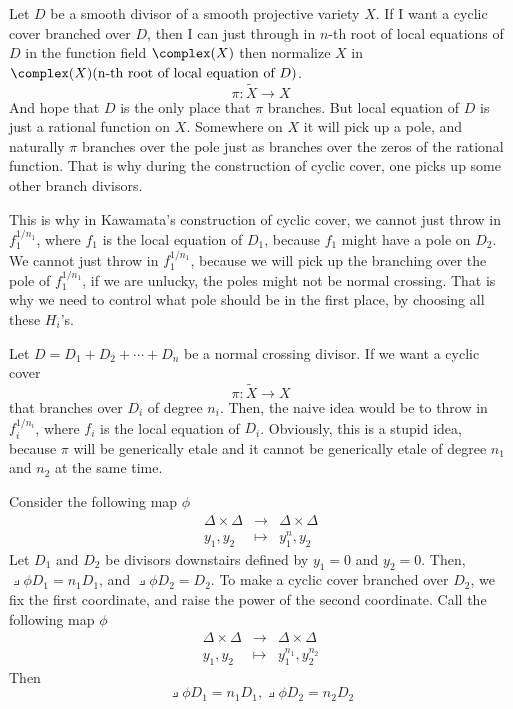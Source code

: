 \documentclass{article}
\begin{document}
Let $D$ be a smooth divisor of a smooth projective variety $X$. 
If I want a cyclic cover branched over $D$, then I can just through in
$n$-th root of local equations of $D$ in the function field $\complex(X)$ then
normalize $X$ in $\complex(X)(\text{n-th root of local equation of $D$})$.
\[
    \pi: \tilde{X} \rightarrow X
\]
And hope that $D$ is the only place that $\pi$ branches. But local equation
of $D$ is just a rational function on $X$. Somewhere on $X$ it will pick up
a pole, and naturally $\pi$ branches over the pole just as branches over the zeros
of the rational function. That is why during the construction of cyclic cover, one
picks up some other branch divisors.

This is why in Kawamata's construction of cyclic cover, we cannot just throw in
$f_1^{1/n_1}$, where $f_1$ is the local equation of $D_1$, because $f_1$ might 
have a pole on $D_2$. We cannot just throw in $f_1^{1/n_1}$, because we will 
pick up the branching over the pole of $f_1^{1/n_1}$, if we are unlucky, the 
poles might not be normal crossing. That is why we need to control what pole
should be in the first place, by choosing all these $H_i$'s.
 

Let $D = D_1 + D_2 +\cdots + D_n$ be a normal crossing divisor. If we want a 
cyclic cover 
\[
    \pi: \tilde{X} \rightarrow X
\]
that branches over $D_i$ of degree $n_i$. Then, the naive idea would be 
to throw in $f_i^{1/n_i}$, where $f_i$ is the local equation of $D_i$. 
Obviously, this is a stupid idea, because $\pi$ will be generically etale
and it cannot be generically etale of degree $n_1$ and $n_2$ at the same
time. 

Consider the following map $\phi$
\begin{align*}
    \Delta\times\Delta & \rightarrow & \Delta\times\Delta \\
      y_1, y_2         & \mapsto     & y_1^n, y_2
\end{align*}
Let $D_1$ and $D_2$ be divisors downstairs defined by $y_1=0$ and $y_2=0$.
Then, $\pullback{\phi}D_1 = n_1D_1$, and $\pullback{\phi}D_2 = D_2$. To make
a cyclic cover branched over $D_2$, we fix the first coordinate, and raise the 
power of the second coordinate. Call the following map $\phi$
\begin{align*}
    \Delta\times\Delta & \rightarrow & \Delta\times\Delta \\
      y_1, y_2         & \mapsto     & y_1^{n_1}, y_2^{n_2}
\end{align*}
Then
\[
    \pullback{\phi}D_1 = n_1D_1, \pullback{\phi}D_2 = n_2D_2
\]
\end{document}

